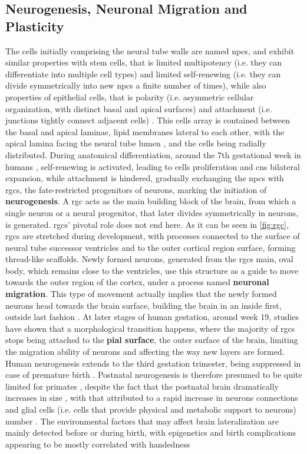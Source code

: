 \subsection{Neurogenesis, Neuronal Migration and Plasticity}
\label{subsec:plasticity}
The cells initially comprising the neural tube walls are named \acp{npc}, and exhibit similar properties with stem cells, that is limited multipotency (i.e. they can differentiate into multiple cell types) and limited self-renewing (i.e. they can divide symmetrically into new \acp{npc} a finite number of times), while also properties of epithelial cells, that is polarity (i.e. asymmetric cellular organization, with distinct basal and apical surfaces)  and attachment (i.e. junctions tightly connect adjacent cells) \cite{Gotz2005}. This cells array is contained between the basal and apical laminae, lipid membranes lateral to each other, with the apical lamina facing the neural tube lumen \cite{Aaku-Saraste1997}, and the cells being radially distributed. During anatomical differentiation, around the 7th gestational week in humans \cite{Nowakowski2016}, self-renewing is activated, leading to cells proliferation and \ac{cns} bilateral expansion, while attachment is hindered, gradually exchanging the \acp{npc} with \acp{rgc}, the fate-restricted progenitors of neurons, marking the initiation of \textbf{neurogenesis}\cite{Gotz2005}. A \ac{rgc} acts as the main building block of the brain, from which a single neuron or a neural progenitor, that later divides symmetrically in neurons, is generated. \Acp{rgc}' pivotal role does not end here. As it can be seen in \autoref{fig:rgc}, \acsp{rgc} are stretched during development, with processes connected to the surface of neural tube successor ventricles and to the outer cortical region surface, forming thread-like scaffolds. Newly formed neurons, generated from the \acsp{rgc} main, oval body, which remains close to the ventricles, use this structure as a guide to move towards the outer region of the cortex, under a process named \textbf{neuronal migration}\cite{Rakic2009}. This type of movement actually implies that the newly formed neurons head towards the brain surface, building the brain in an inside first, outside last fashion \cite{Molnar2019}. At later stages of human gestation, around week 19, studies have shown that a morphological transition happens, where the majority of \acp{rgc} stops being attached to the \textbf{pial surface}, the outer surface of the brain, limiting the migration ability of neurons  \cite{Nowakowski2016} and affecting the way new layers are formed. Human neurogenesis extends to the third gestation trimester, being suppressed in case of premature birth \cite{Malik2013}. Postnatal neurogenesis is therefore presumed to be quite limited for primates \cite{Ernst2015}, despite the fact that the postnatal brain  dramatically increases in size , with that attributed to a rapid increase in neurons connections and glial cells (i.e. cells that provide physical and metabolic support to neurons) number \cite{Dyck2017}. The environmental factors that may affect brain lateralization are mainly detected before or during birth, with epigenetics and birth complications  appearing to be mostly correlated with handedness 